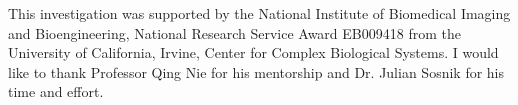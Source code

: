 This investigation was supported by the National Institute of Biomedical Imaging and Bioengineering, National Research Service Award EB009418 from the University of California, Irvine, Center for Complex Biological Systems. I would like to thank Professor Qing Nie for his mentorship and Dr. Julian Sosnik for his time and effort.